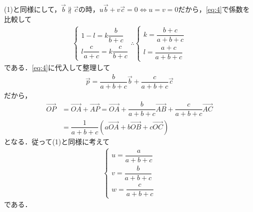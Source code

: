 \documentclass[../../main.tex]{subfiles}
\begin{document}
(1)と同様にして，$\vec{b} \not\parallel \vec{c}$の時，$u \vec{b} + v \vec{c} = 0 \iff u = v = 0$だから，\cref{eq:4}で係数を比較して
\begin{align}
  \begin{cases}
    1-l = k \dfrac{b}{b+c} \\
    l \dfrac{c}{a+c} = k \dfrac{c}{b+c}
  \end{cases}
  \therefore
  \begin{cases}
    k = \dfrac{b+c}{a+b+c} \\
    l = \dfrac{a+c}{a+b+c}
  \end{cases} \label{eq:5}
\end{align}
である．\cref{eq:4}に代入して整理して
\begin{align}
  \vec{p} = \dfrac{b}{a+b+c} \vec{b} + \dfrac{c}{a+b+c} \vec{c}
\end{align}
だから，
\begin{align}
  \overrightarrow{OP}
  & = \overrightarrow{OA} + \overrightarrow{AP} = \overrightarrow{OA} + \dfrac{b}{a+b+c} \overrightarrow{AB} + \dfrac{c}{a+b+c} \overrightarrow{AC} \\
  & = \dfrac{1}{a+b+c} (a \overrightarrow{OA} + b \overrightarrow{OB} + c \overrightarrow{OC})
\end{align}
となる．従って(1)と同様に考えて
\begin{align}
  \begin{cases}
    u = \dfrac{a}{a+b+c} \\
    v = \dfrac{b}{a+b+c} \\
    w = \dfrac{c}{a+b+c}
  \end{cases}
\end{align}
である．
\end{document}
